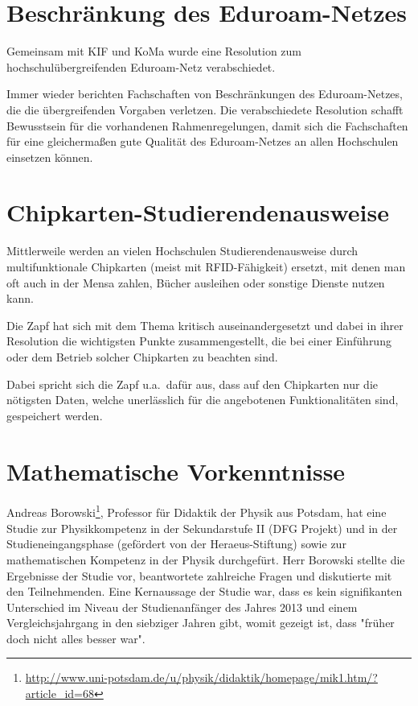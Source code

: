 \documentclass{scrartcl}
\begin{document}
\section*{Beschränkung des Eduroam-Netzes}

Gemeinsam mit KIF und KoMa wurde eine Resolution zum hochschulübergreifenden
Eduroam-Netz verabschiedet.

Immer wieder berichten Fachschaften von Beschränkungen des Eduroam-Netzes, die
die übergreifenden Vorgaben verletzen. Die verabschiedete Resolution schafft 
Bewusstsein für die vorhandenen Rahmenregelungen, damit sich die Fachschaften
für eine gleichermaßen gute Qualität des Eduroam-Netzes an allen Hochschulen
einsetzen können.

\section*{Chipkarten-Studierendenausweise}

Mittlerweile werden an vielen Hochschulen Studierendenausweise durch
multifunktionale Chipkarten (meist mit RFID-Fähigkeit) ersetzt, mit denen man
oft auch in der Mensa zahlen, Bücher ausleihen oder sonstige Dienste nutzen
kann.

Die Zapf hat sich mit dem Thema kritisch auseinandergesetzt und dabei in ihrer
Resolution die wichtigsten Punkte zusammengestellt, die bei einer
Einführung oder dem Betrieb solcher Chipkarten zu beachten sind.

Dabei spricht sich die Zapf u.a.\ dafür aus, dass auf den Chipkarten nur die
nötigsten Daten, welche unerlässlich für die angebotenen Funktionalitäten sind,
gespeichert werden.

\section*{Mathematische Vorkenntnisse}

Andreas Borowski\footnote{\href{http://www.uni-potsdam.de/u/physik/didaktik/homepage/mik1.htm/?article_id=68}{\url{http://www.uni-potsdam.de/u/physik/didaktik/homepage/mik1.htm/?article_id=68}}},
Professor für Didaktik der Physik aus Potsdam, hat eine Studie zur Physikkompetenz
in der Sekundarstufe II (DFG Projekt) und in der Studieneingangsphase
(gefördert von der Heraeus-Stiftung) sowie zur mathematischen Kompetenz in
der Physik durchgefürt. Herr Borowski stellte die Ergebnisse der Studie vor, beantwortete zahlreiche Fragen und diskutierte mit den Teilnehmenden. Eine Kernaussage der Studie war, dass es kein signifikanten Unterschied im Niveau der Studienanfänger des Jahres 2013 und einem Vergleichsjahrgang in den siebziger Jahren gibt, womit gezeigt ist, dass "früher doch nicht alles besser war".
\end{document}
